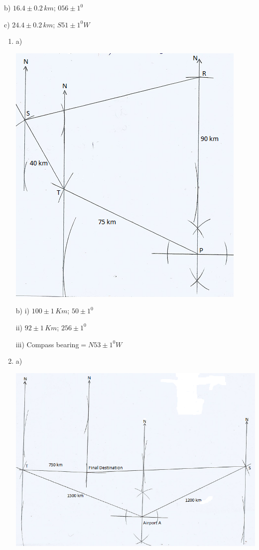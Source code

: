 \documentclass[
  a4paperpaper,
]{scrbook}
\begin{document}
\begin{tcolorbox}
\begin{enumerate}
  b) \(16.4\pm0.2\,km\); \(056\pm1^0\)

  c) \(24.4\pm0.2 \,km\); \(S51\pm1^0W\)
\end{enumerate}

\begin{enumerate}
\def\labelenumi{\arabic{enumi}.}
\setcounter{enumi}{5}
\item
  a)

  \includegraphics{figures/6Q.png}

  b) i) \(100\pm1\,Km\); \(50\pm1^0\)

  ii) \(92\pm1\,Km\); \(256\pm1^0\)

  iii) Compass bearing\(=N53\pm1^0W\)
\item
  a)

  \includegraphics{figures/7Q.png}


\end{enumerate}
\end{tcolorbox}
\end{document}
